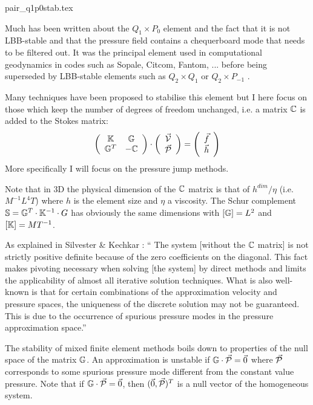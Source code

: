 \begin{flushright} {\tiny {\color{gray} pair\_q1p0stab.tex}} \end{flushright}
Much has been written about the $Q_1\times P_0$ element and the fact that it is not LBB-stable and that the pressure field contains a chequerboard mode that needs to be filtered out. 
It was the principal element used in computational geodynamics in codes such as Sopale, Citcom, Fantom, ... before being 
superseded by LBB-stable elements such as $Q_2\times Q_1$ or $Q_2\times P_{-1}$ \cite{thba21}.

Many techniques have been proposed to stabilise this element but I here focus on those which keep the number of degrees of freedom unchanged, i.e. a matrix ${\mathbb{C}}$ is added to the Stokes matrix:
\[
\left(
\begin{array}{cc}
{\mathbb{K}} & {\mathbb{G}} \\
{\mathbb{G}}^T & -{\mathbb{C}} 
\end{array}
\right)
\cdot
\left(
\begin{array}{c}
\vec{\cal V} \\
\vec{\cal P}
\end{array}
\right)
=
\left(
\begin{array}{c}
\vec{f} \\
\vec{h}
\end{array}
\right)
\]
More specifically I will focus on the pressure jump methods.

Note that in 3D the physical dimension of the ${\mathbb{C}}$ matrix is that of $h^{dim}/\eta$ (i.e. $M^{-1}L^4T$) where $h$ is the element size and $\eta$ a viscosity. The Schur complement ${\mathbb{S}}={\mathbb{G}}^T\cdot {\mathbb{K}}^{-1} \cdot G$ has obviously the same dimensions with $[{\mathbb{G}}]=L^2$ and $[{\mathbb{K}}]=MT^{-1}$.

As explained in Silvester \& Kechkar \cite{sike90}: ``
The system [without the ${\mathbb{C}}$ matrix] is not strictly positive definite because of the zero coefficients on the
diagonal. This fact makes pivoting necessary when solving [the system] by direct methods and limits the applicability of almost all iterative solution techniques. What is also well-known is that for certain combinations of the approximation velocity and pressure spaces, the uniqueness of the discrete solution may not be guaranteed. This is due to the occurrence of spurious pressure modes in the pressure approximation space.''

The stability of mixed finite element methods boils down to properties of the null space of the matrix ${\mathbb{G}}$. 
An approximation is unstable if ${\mathbb{G}} \cdot \vec{\cal P} = \vec{0}$ where $\vec{\cal P}$ corresponds to some spurious pressure mode different from the constant value pressure. Note that if ${\mathbb{G}}\cdot \vec{\cal P} = \vec{0}$, then $(\vec{0},\vec{\cal P})^T$ is a null vector of  
the homogeneous system. 

